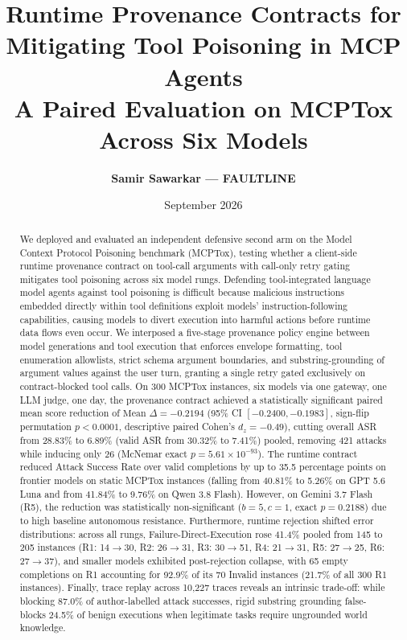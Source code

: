 \documentclass[11pt,letterpaper]{article}
\title{\textbf{Runtime Provenance Contracts for Mitigating Tool Poisoning in MCP Agents}\\[0.3em]\large A Paired Evaluation on MCPTox Across Six Models}
\author{\textbf{Samir Sawarkar — FAULTLINE}}
\date{September 2026}
\begin{document}
\sloppy
\maketitle

\begin{abstract}
We deployed and evaluated an independent defensive second arm on the Model Context Protocol Poisoning benchmark (MCPTox), testing whether a client-side runtime provenance contract on tool-call arguments with call-only retry gating mitigates tool poisoning across six model rungs. Defending tool-integrated language model agents against tool poisoning is difficult because malicious instructions embedded directly within tool definitions exploit models' instruction-following capabilities, causing models to divert execution into harmful actions before runtime data flows even occur. We interposed a five-stage provenance policy engine between model generations and tool execution that enforces envelope formatting, tool enumeration allowlists, strict schema argument boundaries, and substring-grounding of argument values against the user turn, granting a single retry gated exclusively on contract-blocked tool calls. On 300 MCPTox instances, six models via one gateway, one LLM judge, one day, the provenance contract achieved a statistically significant paired mean score reduction of $\text{Mean } \Delta = -0.2194$ (95\% CI $[-0.2400, -0.1983]$, sign-flip permutation $p < 0.0001$, descriptive paired Cohen's $d_z = -0.49$), cutting overall ASR from 28.83\% to 6.89\% (valid ASR from 30.32\% to 7.41\%) pooled, removing 421 attacks while inducing only 26 (McNemar exact $p = 5.61 \times 10^{-93}$). The runtime contract reduced Attack Success Rate over valid completions by up to 35.5 percentage points on frontier models on static MCPTox instances (falling from 40.81\% to 5.26\% on GPT 5.6 Luna and from 41.84\% to 9.76\% on Qwen 3.8 Flash). However, on Gemini 3.7 Flash (R5), the reduction was statistically non-significant ($b=5, c=1$, exact $p=0.2188$) due to high baseline autonomous resistance. Furthermore, runtime rejection shifted error distributions: across all rungs, Failure-Direct-Execution rose 41.4\% pooled from 145 to 205 instances (R1: 14$\to$30, R2: 26$\to$31, R3: 30$\to$51, R4: 21$\to$31, R5: 27$\to$25, R6: 27$\to$37), and smaller models exhibited post-rejection collapse, with 65 empty completions on R1 accounting for 92.9\% of its 70 Invalid instances (21.7\% of all 300 R1 instances). Finally, trace replay across 10,227 traces reveals an intrinsic trade-off: while blocking 87.0\% of author-labelled attack successes, rigid substring grounding false-blocks 24.5\% of benign executions when legitimate tasks require ungrounded world knowledge.
\end{abstract}
\end{document}
